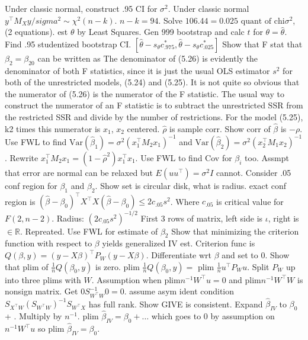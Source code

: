 Under classic normal, construct .95 CI for $\sigma^2$.
\A Under classic normal $y^{\top}M_X y / sigma^2 \sim \chi^2 (n-k)$.
$n - k = 94$.
Solve $106.44 = \text{0.025 quant of chi} \sigma^2$, (2 equations).
\Q est $\theta$ by Least Squares.
Gen 999 bootstrap and calc $t$ for $\theta = \hat{\theta}$.
Find .95 studentized bootstrap CI.
\A $[\hat{\theta} - s_{\theta} c^{\ast} _{.975}, \hat{\theta} - s_{\theta} c^{\ast} _{.025} ]$
\Q Show that F stat that $\beta_2 = \beta_{20}$ can be written as
\A The denominator of (5.26) is evidently the denominator of both F statistics,
since it is just the usual OLS estimator $s^2$ for both of the unrestricted models,
(5.24) and (5.25). It is not quite so obvious that the numerator of (5.26) is
the numerator of the F statistic. The usual way to construct the numerator
of an F statistic is to subtract the unrestricted SSR from the restricted SSR
and divide by the number of restrictions. For the model (5.25), k2 times this
numerator is
\Q $x_1$, $x_2$ centered.
$\hat{\rho}$ is sample corr.
Show corr of $\hat{\beta}$ is $- \rho$.
\A Use FWL to find $\text{Var}(\hat{\beta}_1) = \sigma^2 (x_1 ^{\top} M_2 x_1 )^{-1}$ and $\text{Var}(\hat{\beta}_2) = \sigma^2 (x_2 ^{\top} M_1 x_2 )^{-1}$.
Rewrite $x_1 ^{\top}M_{2}x_1 = (1-\hat{\rho}^2)x_1 ^{\top} x_1 $.
Use FWL to find Cov for $\beta_i$ too.
Assmpt that error are normal can be relaxed but $E(uu^{\top}) = \sigma^2 I$ cannot.
\Q Consider .05 conf region for $\beta_1$ and $\beta_2$.
Show set is circular disk, what is radius.
\A exact conf region is $(\hat{\beta} - \beta_0 )^{\top} X^{\top} X (\hat{\beta} - \beta_0) \leq 2 c_{.05} s^2$.
Where $c_{.05}$ is critical value for $F(2, n-2)$.
Radius: $(2 c_{.05} s^2)^{-1/2}$
\Q First 3 rows of matrix, left side is $\iota$, right is $\in \mathbb{R}$.
Repreated.
\A Use FWL for estimate of $\beta_2$
\Q Show that minimizing the criterion function with respect to $\beta$ yields generalized IV est.
\A Criterion func is $Q(\beta, y) = (y - X\beta)^{\top} P_{W} (y-X \beta)$.
Differentiate wrt $\beta$ and set to 0.
\Q Show that plim of $\frac{1}{n}Q(\beta_0 , y)$ is zero.
\A plim $\frac{1}{n} Q(\beta_0 , y) = $ plim $\frac{1}{n}u^{\top} P_W u$.
Split $P_W$ up into three plims with $W$.
Assumption when plim$n^{-1} W^{\top}u = 0$ and plim$n^{-1} W^{\top}W$ is nonsign matrix.
Get $0 S^{-1}_{W^{\top}W} 0 = 0$.
\Q assume asym ident condition $S_{X^\top W} (S_{W^{\top}W})^{-1} S_{W^{\top} X}$ has full rank.
Show GIVE is consistent.
\A Expand $\hat{\beta}_{IV}$ to $\beta_0$ + \hdots.
Multiply by $n^{-1}$.
plim $\hat{\beta}_{IV} = \beta_0 + \hdots$ which goes to 0 by assumption on $n^{-1}W^{\top} u$ so plim $\hat{\beta}_{IV} = \beta_0$.
